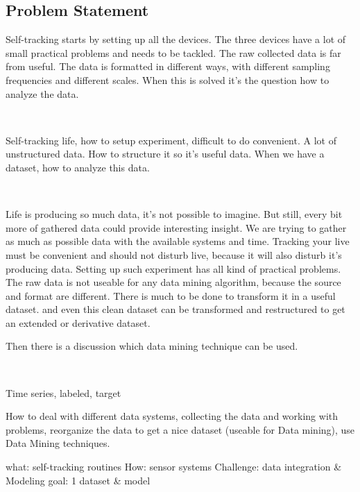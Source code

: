 	\subsection{Problem Statement}
		Self-tracking starts by setting up all the devices. The three devices have a lot of small practical problems and needs to be tackled. The raw collected data is far from useful. The data is formatted in different ways, with different sampling frequencies and different scales. When this is solved it's the question how to analyze the data.

		\

		Self-tracking life, how to setup experiment, difficult to do convenient. A lot of unstructured data. How to structure it so it's useful data. 
		When we have a dataset, how to analyze this data. 

		\

		Life is producing so much data, it's not possible to imagine. But still, every bit more of gathered data could provide interesting insight. We are trying to gather as much as possible data with the available systems and time. Tracking your live must be convenient and should not disturb live, because it will also disturb it's producing data. Setting up such experiment has all kind of practical problems. The raw data is not useable for any data mining algorithm, because the source and format are different. There is much to be done to transform it in a useful dataset. and even this clean dataset can be transformed and restructured to get an extended or derivative dataset. 

		Then there is a discussion which data mining technique can be used. 


		\
			
		Time series, labeled, target

		How to deal with different data systems, collecting the data and working with problems, reorganize the data to get a nice dataset (useable for Data mining), use Data Mining techniques.

		what: self-tracking routines
		How: sensor systems
		Challenge: data integration \& Modeling
		goal: 1 dataset \& model

